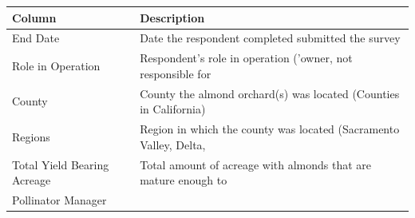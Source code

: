 \documentclass[12pt,]{article}
\begin{document}
\begin{longtable}[]{@{}ll@{}}
\toprule
\begin{minipage}[b]{0.38\columnwidth}\raggedright\strut
Column\strut
\end{minipage} & \begin{minipage}[b]{0.18\columnwidth}\raggedright\strut
Description\strut
\end{minipage}\tabularnewline
\midrule
\endhead
\begin{minipage}[t]{0.38\columnwidth}\raggedright\strut
End Date\strut
\end{minipage} & \begin{minipage}[t]{0.18\columnwidth}\raggedright\strut
Date the respondent completed submitted the survey\strut
\end{minipage}\tabularnewline
\begin{minipage}[t]{0.38\columnwidth}\raggedright\strut
Role in Operation\strut
\end{minipage} & \begin{minipage}[t]{0.18\columnwidth}\raggedright\strut
Respondent's role in operation ('owner, not responsible for\strut
\end{minipage}\tabularnewline
\begin{minipage}[t]{0.38\columnwidth}\raggedright\strut
County\strut
\end{minipage} & \begin{minipage}[t]{0.18\columnwidth}\raggedright\strut
County the almond orchard(s) was located (Counties in California)\strut
\end{minipage}\tabularnewline
\begin{minipage}[t]{0.38\columnwidth}\raggedright\strut
Regions\strut
\end{minipage} & \begin{minipage}[t]{0.18\columnwidth}\raggedright\strut
Region in which the county was located (Sacramento Valley, Delta,\strut
\end{minipage}\tabularnewline
\begin{minipage}[t]{0.38\columnwidth}\raggedright\strut
Total Yield Bearing Acreage\strut
\end{minipage} & \begin{minipage}[t]{0.18\columnwidth}\raggedright\strut
Total amount of acreage with almonds that are mature enough to\strut
\end{minipage}\tabularnewline
\begin{minipage}[t]{0.38\columnwidth}\raggedright\strut
Pollinator Manager\strut
\end{minipage} & \begin{minipage}[t]{0.18\columnwidth}\raggedright\strut

\end{minipage}
\end{longtable}
\end{document}
